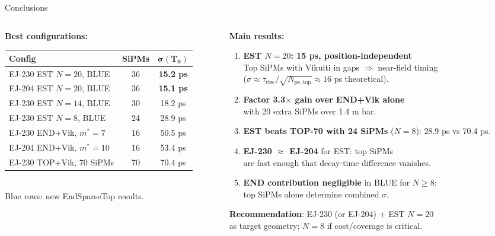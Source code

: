 \documentclass[aspectratio=169,9pt]{beamer}
\begin{document}
\begin{frame}{Conclusions}
\begin{columns}[T]
\begin{column}{0.52\textwidth}
\textbf{Best configurations:}\\[0.3em]
\footnotesize
\begin{tabular}{lcc}
\toprule
\textbf{Config} & \textbf{SiPMs} & $\boldsymbol{\sigma(T_0)}$\\
\midrule
\rowcolor{rownew}
EJ-230 EST $N{=}20$, BLUE & 36 & \textbf{15.2 ps}\\
\rowcolor{rownew}
EJ-204 EST $N{=}20$, BLUE & 36 & \textbf{15.1 ps}\\
\rowcolor{rownew}
EJ-230 EST $N{=}14$, BLUE & 30 & 18.2 ps\\
\rowcolor{rownew}
EJ-230 EST $N{=}8$,  BLUE & 24 & 28.9 ps\\
EJ-230 END+Vik, $m^*{=}7$ & 16 & 50.5 ps\\
EJ-204 END+Vik, $m^*{=}10$& 16 & 53.4 ps\\
EJ-230 TOP+Vik, 70 SiPMs  & 70 & 70.4 ps\\
\bottomrule
\end{tabular}\\[0.3em]
\footnotesize Blue rows: new EndSparseTop results.
\end{column}
\begin{column}{0.44\textwidth}
\textbf{Main results:}\\[0.3em]
\begin{enumerate}\footnotesize
  \item \textbf{EST $N{=}20$: 15 ps, position-independent}\\
        Top SiPMs with Vikuiti in gaps $\Rightarrow$ near-field timing\\
        ($\sigma \approx \tau_\mathrm{rise}/\sqrt{N_\mathrm{pe,top}} \approx 16$ ps theoretical).
  \item \textbf{Factor 3.3$\times$ gain over END+Vik alone}\\
        with 20 extra SiPMs over 1.4 m bar.
  \item \textbf{EST beats TOP-70 with 24 SiPMs} ($N{=}8$):
        28.9 ps vs 70.4 ps.
  \item \textbf{EJ-230 $\approx$ EJ-204} for EST: top SiPMs\\
        are fast enough that decay-time difference vanishes.
  \item \textbf{END contribution negligible} in BLUE for $N{\geq}8$:\\
        top SiPMs alone determine combined $\sigma$.
\end{enumerate}
\vspace{0.2em}
\normalsize
\textbf{Recommendation}: EJ-230 (or EJ-204) + EST $N{=}20$\\
as target geometry; $N{=}8$ if cost/coverage is critical.
\end{column}
\end{columns}
\end{frame}
\end{document}
